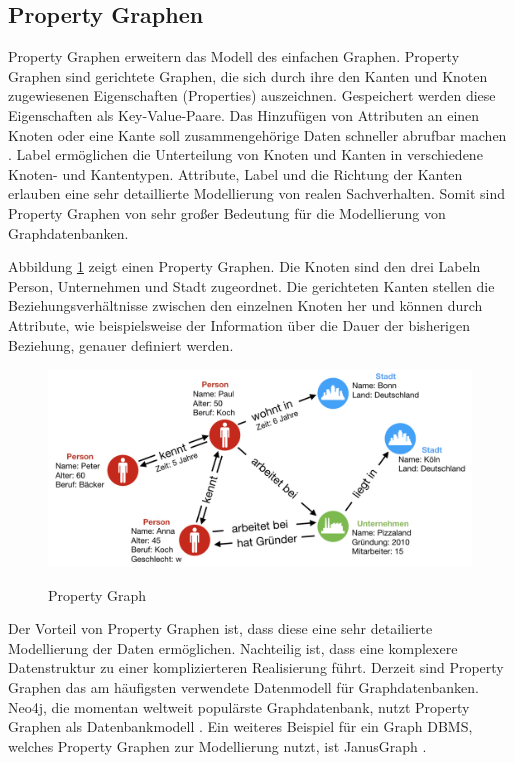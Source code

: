 \subsection{Property Graphen}
Property Graphen erweitern das Modell des einfachen Graphen.
Property Graphen sind gerichtete Graphen, die sich durch ihre den Kanten und Knoten zugewiesenen Eigenschaften (Properties) auszeichnen.
Gespeichert werden diese Eigenschaften als Key-Value-Paare.
Das Hinzufügen von Attributen an einen Knoten oder eine Kante soll zusammengehörige Daten schneller abrufbar machen \cite{angles2012comparison}.
Label ermöglichen die Unterteilung von Knoten und Kanten in verschiedene Knoten- und Kantentypen.
Attribute, Label und die Richtung der Kanten erlauben eine sehr detaillierte Modellierung von realen Sachverhalten.
Somit sind Property Graphen von sehr großer Bedeutung für die Modellierung von Graphdatenbanken.

Abbildung \ref{2.property.image} zeigt einen Property Graphen.
Die Knoten sind den drei Labeln Person, Unternehmen und Stadt zugeordnet.
Die gerichteten Kanten stellen die Beziehungsverhältnisse zwischen den einzelnen Knoten her und können durch Attribute, wie beispielsweise der Information über die Dauer der bisherigen Beziehung, genauer definiert werden.
\begin{figure}[H]
\begin{center}
	\includegraphics[scale = 0.65]{./images/Property_graph.png}
	\label{2.property.image}
	\caption{Property Graph}
\end{center}
\end{figure}


Der Vorteil von Property Graphen ist, dass diese eine sehr detailierte Modellierung der Daten ermöglichen.
Nachteilig ist, dass eine komplexere Datenstruktur zu einer komplizierteren Realisierung führt.
Derzeit sind Property Graphen das am häufigsten verwendete Datenmodell für Graphdatenbanken.
Neo4j, die momentan weltweit populärste Graphdatenbank, nutzt Property Graphen als Datenbankmodell \cite{neo4j}.
Ein weiteres Beispiel für ein Graph \ac{DBMS}, welches Property Graphen zur Modellierung nutzt, ist JanusGraph \cite{janus}.